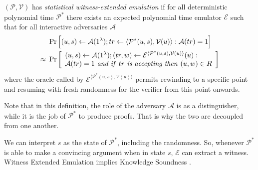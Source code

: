 \begin{definition}
$(\mathcal{P},\mathcal{V})$ has {\em statistical witness-extended emulation} if for all deterministic polynomial time $\mathcal{P}^*$ there exists an expected polynomial time emulator $\mathcal{E}$ such that for all interactive adversaries $\mathcal{A}$
\begin{align*}
& \Pr \Big{[}(u,s) \leftarrow\mathcal{A}(1^{\lambda}); tr \leftarrow \langle \mathcal{P}^*(u,s), \mathcal{V}(u)\rangle: \mathcal{A}(tr)=1 \Big{]}\\
\approx \ & \Pr \left[ \begin{array}{l} (u,s) \leftarrow \mathcal{A}(1^{\lambda}); (tr,w) \leftarrow \mathcal{E}^{ \langle \mathcal{P}^*(u,s), \mathcal{V}(u) \rangle } (u): \\ \mathcal{A}(tr)=1 \text{\emph{ and if }} tr \text{\emph{ is accepting then }} (u,w) \in R \end{array} \right]
\end{align*}
where the oracle called by $\mathcal{E}^{\langle \mathcal{P}^*(u,s), \mathcal{V}(u)\rangle}$ permits rewinding to a specific point and resuming with fresh randomness for the verifier from this point onwards.
\end{definition}
\noindent
Note that in this definition, the role of the adversary $\mathcal{A}$ is as a distinguisher, while it is the job of $\mathcal{P}^*$ to produce proofs. That is why the two are decoupled from one another.

We can interpret $s$ as the state of $\mathcal{P}^*$, including the randomness. So, whenever $\mathcal{P}^*$ is able to make a convincing argument when in state $s$,  $\mathcal{E}$ can extract a witness. Witness Extended Emulation implies Knowledge Soundness \cite{dissertation}.

